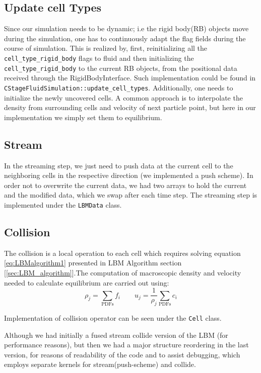 \subsection *{Update cell Types}
Since our simulation needs to be dynamic; i.e the rigid body(RB) objects move during
the simulation, one has to continuously adapt the flag fields during the course of simulation. This is realized by, first, reinitializing all the \texttt {cell_type_rigid_body} flags to fluid and then initializing the \texttt{cell_type_rigid_body} to the current RB objects, from the positional data
received through the RigidBodyInterface. Such implementation could be found in \texttt{CStageFluidSimulation::update_cell_types}. Additionally, one needs to initialize the newly uncovered cells. A common approach is to interpolate the density from surrounding cells and velocity of next particle point, but here in our implementation we simply set them to equilibrium.
\subsection *{Stream}
 In the streaming step, we just need to push data at the current cell to the neighboring cells in the respective direction (we implemented a push scheme). In order not
 to overwrite the current data, we had two arrays to hold the current and the 
 modified data, which we swap after each time step. The streaming step is implemented under the \texttt{LBMData} class. 
 
 \subsection *{Collision} \label{subsection:collision}
 The collision is a local operation to each cell  which requires solving equation \ref{eq:LBMalgorithm1} presented in LBM Algorithm section [\ref{sec:LBM_algorithm}].The computation of macroscopic density and velocity needed to calculate equilibrium are carried out using:
 \[\rho_j = \sum_{\mathrm{PDFs}} f_i\qquad u_j = \frac{1}{\rho_j} \sum_\mathrm{PDFs}
 c_i\]
 
  Implementation of collision operator can be seen under the \texttt{Cell} class.
 
 
 Although we had initially a fused stream collide version of the LBM (for performance reasons), but then we had a major structure reordering in the last version, for reasons of readability of the code and to assist debugging, which employs separate kernels for stream(push-scheme) and collide.
 
